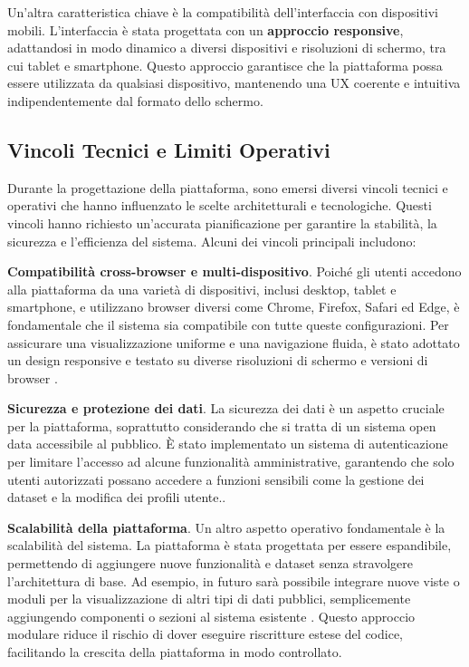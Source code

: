 Un’altra caratteristica chiave è la compatibilità dell'interfaccia con dispositivi mobili. L'interfaccia è stata progettata con un \textbf{approccio responsive}, adattandosi in modo dinamico a diversi dispositivi e risoluzioni di schermo, tra cui tablet e smartphone. Questo approccio garantisce che la piattaforma possa essere utilizzata da qualsiasi dispositivo, mantenendo una UX coerente e intuitiva indipendentemente dal formato dello schermo. 


\subsection{Vincoli Tecnici e Limiti Operativi}

Durante la progettazione della piattaforma, sono emersi diversi vincoli tecnici e operativi che hanno influenzato le scelte architetturali e tecnologiche. Questi vincoli hanno richiesto un'accurata pianificazione per garantire la stabilità, la sicurezza e l'efficienza del sistema. Alcuni dei vincoli principali includono:

\textbf{Compatibilità cross-browser e multi-dispositivo}. Poiché gli utenti accedono alla piattaforma da una varietà di dispositivi, inclusi desktop, tablet e smartphone, e utilizzano browser diversi come Chrome, Firefox, Safari ed Edge, è fondamentale che il sistema sia compatibile con tutte queste configurazioni. Per assicurare una visualizzazione uniforme e una navigazione fluida, è stato adottato un design responsive e testato su diverse risoluzioni di schermo e versioni di browser \cite{w3c2018}.


\textbf{Sicurezza e protezione dei dati}. La sicurezza dei dati è un aspetto cruciale per la piattaforma, soprattutto considerando che si tratta di un sistema open data accessibile al pubblico. È stato implementato un sistema di autenticazione per limitare l’accesso ad alcune funzionalità amministrative, garantendo che solo utenti autorizzati possano accedere a funzioni sensibili come la gestione dei dataset e la modifica dei profili utente.\cite{openssl2020}.

\textbf{Scalabilità della piattaforma}. Un altro aspetto operativo fondamentale è la scalabilità del sistema. La piattaforma è stata progettata per essere espandibile, permettendo di aggiungere nuove funzionalità e dataset senza stravolgere l'architettura di base. Ad esempio, in futuro sarà possibile integrare nuove viste o moduli per la visualizzazione di altri tipi di dati pubblici, semplicemente aggiungendo componenti o sezioni al sistema esistente \cite{feldmann2002scalability}. Questo approccio modulare riduce il rischio di dover eseguire riscritture estese del codice, facilitando la crescita della piattaforma in modo controllato.


